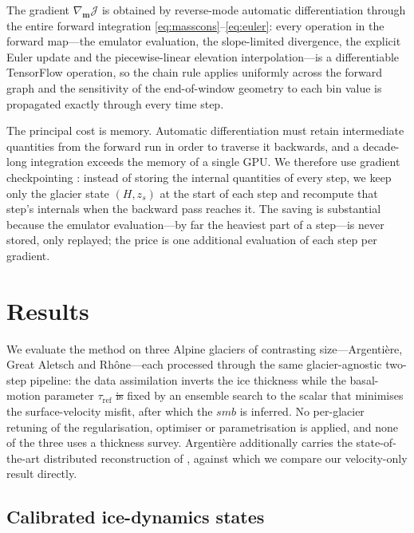 \documentclass[tc, manuscript]{copernicus}
\makeatletter
\providecommand{\DIFadd}[1]{{\protect\color{blue}\uwave{#1}}} %
\providecommand{\DIFdel}[1]{{\protect\color{red}\sout{#1}}} %
\providecommand{\DIFaddbegin}{} %
\providecommand{\DIFaddend}{} %
\providecommand{\DIFdelbegin}{} %
\providecommand{\DIFdelend}{} %
\providecommand{\DIFscaledelfig}{0.5}
\newlength{\DIFdelgraphicswidth} %
\newlength{\DIFdelgraphicsheight} %
\providecommand{\DIFaddincludegraphics}[2][]{{\color{blue}\fbox{\DIFOincludegraphics[#1]{#2}}}} %
\providecommand{\DIFdelincludegraphics}[2][]{%
\sbox{\DIFdelgraphicsbox}{\DIFOincludegraphics[#1]{#2}}%
\settoboxwidth{\DIFdelgraphicswidth}{\DIFdelgraphicsbox} %
\settoboxtotalheight{\DIFdelgraphicsheight}{\DIFdelgraphicsbox} %
\scalebox{\DIFscaledelfig}{%
\parbox[b]{\DIFdelgraphicswidth}{\usebox{\DIFdelgraphicsbox}\\[-\baselineskip] \rule{\DIFdelgraphicswidth}{0em}}\llap{\resizebox{\DIFdelgraphicswidth}{\DIFdelgraphicsheight}{%
\setlength{\unitlength}{\DIFdelgraphicswidth}%
\begin{picture}(1,1)%
\thicklines\linethickness{2pt} %
{\color[rgb]{1,0,0}\put(0,0){\framebox(1,1){}}}%
{\color[rgb]{1,0,0}\put(0,0){\line( 1,1){1}}}%
{\color[rgb]{1,0,0}\put(0,1){\line(1,-1){1}}}%
\end{picture}%
}\hspace*{3pt}}} %
} %
\DeclareRobustCommand{\DIFaddbegin}{\DIFOaddbegin \let\includegraphics\DIFaddincludegraphics} %
\DeclareRobustCommand{\DIFaddend}{\DIFOaddend \let\includegraphics\DIFOincludegraphics} %
\DeclareRobustCommand{\DIFdelbegin}{\DIFOdelbegin \let\includegraphics\DIFdelincludegraphics} %
\DeclareRobustCommand{\DIFdelend}{\DIFOaddend \let\includegraphics\DIFOincludegraphics} %
\let\sout@orig\sout %
\renewcommand{\sout}[1]{\ifmmode\text{\sout@orig{\ensuremath{#1}}}\else\sout@orig{#1}\fi} %
\makeatother
\begin{document}
\DIFaddend The gradient
$\nabla_{\mathbf{m}}\mathcal{J}$ is obtained by reverse-mode automatic
differentiation \citep{baydin2018} through the entire forward integration
\eqref{eq:masscons}--\eqref{eq:euler}: every operation in the forward map---the
emulator evaluation, the slope-limited divergence, the explicit Euler update and
the piecewise-linear elevation interpolation---is a differentiable TensorFlow
\citep{abadi2016} operation, so the chain rule applies uniformly across the forward
graph and the sensitivity of the end-of-window geometry to each bin value is
propagated exactly through every time step.

The principal cost is memory. Automatic differentiation must retain intermediate
quantities from the forward run in order to traverse it backwards, and a decade-long
integration exceeds the memory of a single GPU. We therefore use gradient
checkpointing \citep{griewank2000, chen2016}: instead of storing the internal
quantities of every step, we keep only the glacier state $(H, z_s)$ at the start of
each step and recompute that step's internals when the backward pass reaches it. The
saving is substantial because the emulator evaluation---by far the heaviest part of a
step---is never stored, only replayed; the price is one additional evaluation of each
step per gradient.
\DIFdelbegin %

\DIFdelend \section{Results}\label{sec:results}

We evaluate the method on three Alpine glaciers of contrasting size---Argentière,
Great Aletsch and Rhône---each processed through the same glacier-agnostic two-step
pipeline: the data assimilation inverts the ice thickness while the \DIFaddbegin \DIFadd{Arrhenius factor $A$ and the }\DIFaddend basal-motion
parameter $\tau_{\mathrm{ref}}$ \DIFdelbegin \DIFdel{is }\DIFdelend \DIFaddbegin \DIFadd{are }\DIFaddend fixed by an ensemble search to the scalar that
minimises the surface-velocity misfit, after which the $smb$ is inferred. No
per-glacier retuning of the regularisation, optimiser or parametrisation is applied,
and none of the three uses a thickness survey. Argentière additionally carries the
state-of-the-art distributed reconstruction of \citet{kneib2024}, against which we
compare our velocity-only result directly.


\subsection{Calibrated ice-dynamics states}\label{sec:calib}
\end{document}
